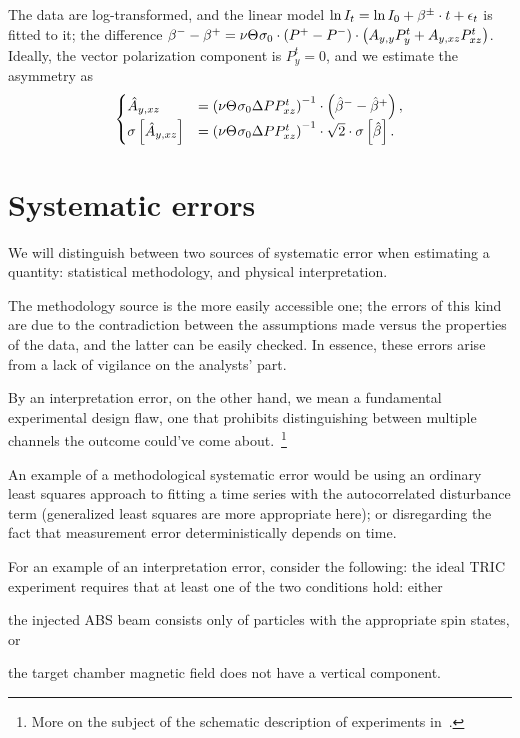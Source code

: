 \documentclass{article}
\begin{document}
The data are log-transformed, and the linear model $\ln I_t = \ln I_0 + \slp^\pm\cdot t + \err_t$ is fitted to it; the difference $\slp^- - \slp^+ = \nu\Thick\CS[0]\cdot\DP*\cdot\bkt{\Ayy P^t_y + \Ayxz P^t_{xz}}$. Ideally, the vector polarization component is $P^t_y = 0$, and we estimate the asymmetry as 
\begin{equation}\label{eq:AyxzEstimator}
\begin{cases}
	\Ayxz* 		&= \bkt{\nu\Thick\CS[0]\DP P^t_{xz}}^{-1}\cdot\bkt{\slp*^- - \slp*^+}, \\
	\SE{\Ayxz*} &= \bkt{\nu\Thick\CS[0]\DP P^t_{xz}}^{-1}\cdot\sqrt2\cdot\SE{\slp*}.
\end{cases}
\end{equation}
 
\section{Systematic errors}

We will distinguish between two sources of systematic error when estimating a quantity: statistical methodology, and physical interpretation.

The methodology source is the more easily accessible one; the errors of this kind are due to the contradiction between the assumptions made versus the properties of the data, and the latter can be easily checked. In essence, these errors arise from a lack of vigilance on the analysts' part.

By an interpretation error, on the other hand, we mean a fundamental experimental design flaw, one that prohibits distinguishing between multiple channels the outcome could've come about.~\footnote{More on the subject of the schematic description of experiments in~\cite{Saunders}.}

An example of a methodological systematic error would be using an ordinary least squares approach to fitting a time series with the autocorrelated disturbance term (generalized least squares are more appropriate here); or disregarding the fact that measurement error deterministically depends on time. 

For an example of an interpretation error, consider the following: the ideal TRIC experiment requires that at least one of the two conditions hold: either
\begin{inparaenum}[1)]
	\item the injected ABS beam consists only of particles with the appropriate spin states, or
	\item the target chamber magnetic field does not have a vertical component.
\end{inparaenum}
\end{document}
